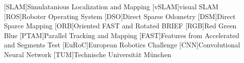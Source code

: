 [SLAM]{Simulatanious Localization and Mapping}
[vSLAM]{visual SLAM}
[ROS]{Roboter Operating System}
[DSO]{Direct Sparse Odometry}
[DSM]{Direct Sparce Mapping}
[ORB]{Oriented FAST and Rotated BRIEF}
[RGB]{Red Green Blue}
[PTAM]{Parallel Tracking and Mapping}
[FAST]{Features from Accelerated and Segments Test}
[EuRoC]{European Robotics Challenge}
[CNN]{Convolutional Neural Network}
[TUM]{Technische Universität München}

